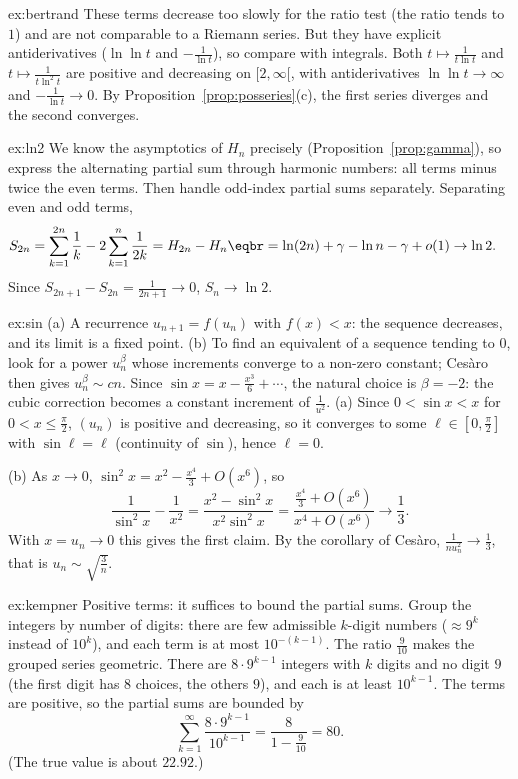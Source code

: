 \begin{solution}{ex:bertrand}
\idea These terms decrease too slowly for the ratio test (the ratio tends to $1$) and are not comparable to a Riemann series. But they have explicit antiderivatives ($\ln\ln t$ and $-\frac1{\ln t}$), so compare with integrals.
\writeup Both $t\mapsto\frac1{t\ln t}$ and $t\mapsto\frac1{t\ln^2t}$ are positive and decreasing on $[2,\infty[$, with antiderivatives $\ln\ln t\to\infty$ and
$-\frac1{\ln t}\to0$. By Proposition~\ref{prop:posseries}(c), the first series diverges and the second converges.
\end{solution}

\begin{solution}{ex:ln2}
\idea We know the asymptotics of $H_n$ precisely (Proposition~\ref{prop:gamma}), so express the alternating partial sum through harmonic numbers: all terms minus twice the even terms. Then handle odd-index partial sums separately.
\writeup Separating even and odd terms,
\[
\begin{aligned}S_{2n}&=\sum_{k=1}^{2n}\frac1k-2\sum_{k=1}^n\frac1{2k}=H_{2n}-H_n\eqbr=\ln(2n)+\gamma-\ln n-\gamma+o(1)\to\ln2.\end{aligned}
\]
Since $S_{2n+1}-S_{2n}=\frac1{2n+1}\to0$, $S_n\to\ln2$.
\end{solution}

\begin{solution}{ex:sin}
\idea (a) A recurrence $u_{n+1}=f(u_n)$ with $f(x)<x$: the sequence decreases, and its limit is a fixed point. (b) To find an equivalent of a sequence tending to $0$, look for a power $u_n^\beta$ whose increments converge to a non-zero constant; Ces\`aro then gives $u_n^\beta\sim cn$. Since $\sin x=x-\frac{x^3}6+\cdots$, the natural choice is $\beta=-2$: the cubic correction becomes a constant increment of $\frac1{u^2}$.
\writeup (a) Since $0<\sin x<x$ for $0<x\le\frac\pi2$, $(u_n)$ is positive and decreasing, so it converges to some $\ell\in\left[0,\frac\pi2\right]$ with $\sin\ell=\ell$ (continuity of $\sin$), hence $\ell=0$.

(b) As $x\to0$, $\sin^2x=x^2-\frac{x^4}3+O(x^6)$, so
\[
\frac1{\sin^2x}-\frac1{x^2}=\frac{x^2-\sin^2x}{x^2\sin^2x}=\frac{\frac{x^4}3+O(x^6)}{x^4+O(x^6)}\to\frac13.
\]
With $x=u_n\to0$ this gives the first claim. By the corollary of Ces\`aro, $\frac1{nu_n^2}\to\frac13$, that is $u_n\sim\sqrt{\frac3n}$.
\end{solution}

\begin{solution}{ex:kempner}
\idea Positive terms: it suffices to bound the partial sums. Group the integers by number of digits: there are few admissible $k$-digit numbers ($\approx9^k$ instead of $10^k$), and each term is at most $10^{-(k-1)}$. The ratio $\frac9{10}$ makes the grouped series geometric.
\writeup There are $8\cdot9^{k-1}$ integers with $k$ digits and no digit $9$ (the first digit has $8$ choices, the others $9$), and each is at least $10^{k-1}$.
The terms are positive, so the partial sums are bounded by
\[
\sum_{k=1}^\infty\frac{8\cdot9^{k-1}}{10^{k-1}}=\frac8{1-\frac9{10}}=80.
\]
(The true value is about $22.92$.)
\end{solution}

